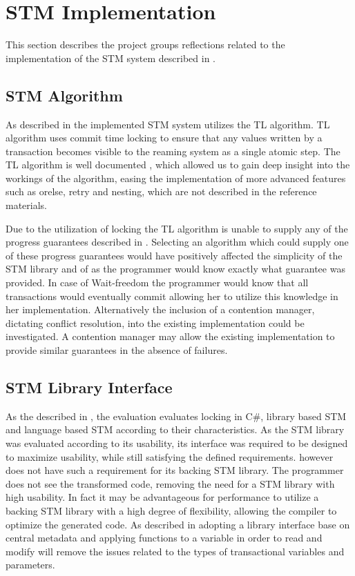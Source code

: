 \section{STM Implementation}\label{sec:reflection_stm_implementation}
This section describes the project groups reflections related to the implementation of the \ac{STM} system described in .

\subsection{STM Algorithm}
As described in  the implemented \ac{STM} system utilizes the TL algorithm\cite{dice2006transactional}. TL algorithm uses commit time locking to ensure that any values written by a transaction becomes visible to the reaming system as a single atomic step. The TL algorithm is well documented \cite{dice2006transactional}\cite[p. 438]{herlihy2012art}\cite[p. 106]{harris2010transactional}, which allowed us to gain deep insight into the workings of the algorithm, easing the implementation of more advanced features such as orelse, retry and nesting, which are not described in the reference materials.

Due to the utilization of locking the TL algorithm is unable to supply any of the progress guarantees described in . Selecting an algorithm which could supply one of these progress guarantees would have positively affected the simplicity of the \ac{STM} library and of \stmname as the programmer would know exactly what guarantee was provided. In case of Wait-freedom the programmer would know that all transactions would eventually commit allowing her to utilize this knowledge in her implementation. Alternatively the inclusion of a contention manager, dictating conflict resolution, into the existing implementation could be investigated. A contention manager may allow the existing implementation to provide similar guarantees in the absence of failures.

\subsection{STM Library Interface}
As the described in , the evaluation evaluates locking in C\#, library based \ac{STM} and language based \ac{STM} according to their characteristics. As the \ac{STM} library was evaluated according to its usability, its interface was required to be designed to maximize usability, while still satisfying the defined requirements. \stmname however does not have such a requirement for its backing \ac{STM} library. The programmer does not see the transformed code, removing the need for a \ac{STM} library with high usability. In fact it may be advantageous for performance to utilize a backing \ac{STM} library with a high degree of flexibility, allowing the compiler to optimize the generated code. As described in  adopting a library interface base on central metadata and applying functions to a variable in order to read and modify will remove the issues related to the types of transactional variables and  parameters.

